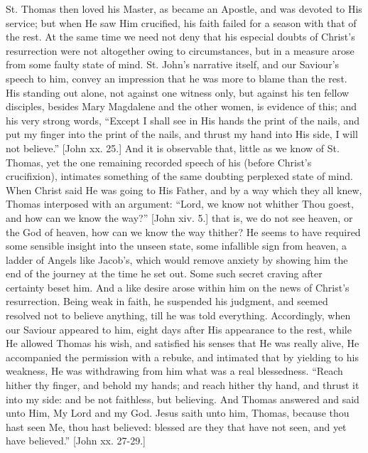 St. Thomas then loved his Master, as became an Apostle, and was
devoted to His service; but when He saw Him crucified, his faith
failed for a season with that of the rest. At the same time we need
not deny that his especial doubts of Christ's resurrection were not
altogether owing to circumstances, but in a measure arose from some
faulty state of mind. St. John's narrative itself, and our Saviour's
speech to him, convey an impression that he was more to blame than the
rest. His standing out alone, not against one witness only, but
against his ten fellow disciples, besides Mary Magdalene and the other
women, is evidence of this; and his very strong words, ``Except I
shall see in His hands the print of the nails, and put my finger into
the print of the nails, and thrust my hand into His side, I will not
believe.'' [John xx. 25.] And it is observable that, little as we
know of St. Thomas, yet the one remaining recorded speech of his
(before Christ's crucifixion), intimates something of the same
doubting perplexed state of mind. When Christ said He was going to His
Father, and by a way which they all knew, Thomas interposed with an
argument: ``Lord, we know not whither Thou goest, and how can we
know the way?'' [John xiv. 5.] that is, we do not see heaven, or
the God of heaven, how can we know the way thither? He seems to have
required some sensible insight into the unseen state, some infallible
sign from heaven, a ladder of Angels like Jacob's, which would remove
anxiety by showing him the end of the journey at the time he set out.
Some such secret craving after certainty beset him. And a like desire
arose within him on the news of Christ's resurrection. Being weak in
faith, he suspended his judgment, and seemed resolved not to believe
anything, till he was told everything. Accordingly, when our Saviour
appeared to him, eight days after His appearance to the rest, while He
allowed Thomas his wish, and satisfied his senses that He was really
alive, He accompanied the permission with a rebuke, and intimated that
by yielding to his weakness, He was withdrawing from him what was a
real blessedness. ``Reach hither thy finger, and behold my hands;
and reach hither thy hand, and thrust it into my side: and be not
faithless, but believing. And Thomas answered and said unto Him, My
Lord and my God. Jesus saith unto him, Thomas, because thou hast seen
Me, thou hast believed: blessed are they that have not seen, and yet
have believed.'' [John xx. 27-29.]

